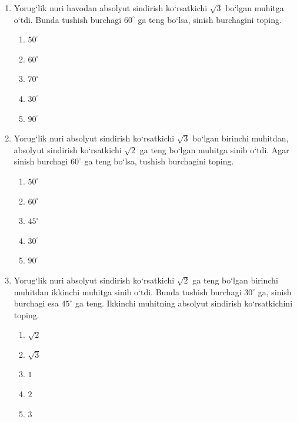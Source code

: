 \begin{enumerate}

\begin{enumerate}[label=\Alph*)]
\item 1.
\item 2.
\item 3.
\item 4.
\item 5.
\end{enumerate}

\item Yorug‘lik nuri havodan absolyut sindirish ko‘rsatkichi $\sqrt{3}$ bo‘lgan muhitga o‘tdi. Bunda tushish burchagi $60^\circ$ ga teng bo‘lsa, sinish burchagini toping.
\begin{enumerate}[label=\Alph*)]
\item $50^\circ$
\item $60^\circ$
\item $70^\circ$
\item $30^\circ$
\item $90^\circ$
\end{enumerate}

\item Yorug‘lik nuri absolyut sindirish ko‘rsatkichi $\sqrt{3}$ bo‘lgan birinchi muhitdan, absolyut sindirish ko‘rsatkichi $\sqrt{2}$ ga teng bo‘lgan muhitga sinib o‘tdi. Agar sinish burchagi $60^\circ$ ga teng bo‘lsa, tushish burchagini toping.
\begin{enumerate}[label=\Alph*)]
\item $50^\circ$
\item $60^\circ$
\item $45^\circ$
\item $30^\circ$
\item $90^\circ$
\end{enumerate}

\item Yorug‘lik nuri absolyut sindirish ko‘rsatkichi $\sqrt{2}$ ga teng bo‘lgan birinchi muhitdan ikkinchi muhitga sinib o‘tdi. Bunda tushish burchagi $30^\circ$ ga, sinish burchagi esa $45^\circ$ ga teng. Ikkinchi muhitning absolyut sindirish ko‘rsatkichini toping.
\begin{enumerate}[label=\Alph*)]
\item $\sqrt{2}$
\item $\sqrt{3}$
\item $1$
\item $2$
\item $3$
\end{enumerate}


\end{enumerate}
